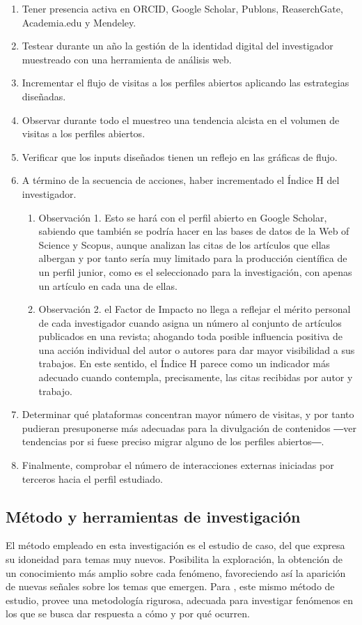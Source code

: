 \documentclass{textolivre}
\begin{document}
\begin{enumerate}
    \item Tener presencia activa en ORCID, Google Scholar, Publons, ReaserchGate, Academia.edu y Mendeley.
    \item Testear durante un año la gestión de la identidad digital del investigador muestreado con una herramienta de análisis web.
    \item Incrementar el flujo de visitas a los perfiles abiertos aplicando las estrategias diseñadas.
    \item Observar durante todo el muestreo una tendencia alcista en el volumen de visitas a los perfiles abiertos.
    \item Verificar que los inputs diseñados tienen un reflejo en las gráficas de flujo.
    \item  A término de la secuencia de acciones, haber incrementado el Índice H del investigador. 
        \begin{enumerate}
        \item Observación 1. Esto se hará con el perfil abierto en Google Scholar, sabiendo que también se podría hacer en las bases de datos de la Web of Science y Scopus, aunque analizan las citas de los artículos que ellas albergan y por tanto sería muy limitado para la producción científica de un perfil junior, como es el seleccionado para la investigación, con apenas un artículo en cada una de ellas.
        \item Observación 2. el Factor de Impacto no llega a reflejar el mérito personal de cada investigador cuando asigna un número al conjunto de artículos publicados en una revista; ahogando toda posible influencia positiva de una acción individual del autor o autores para dar mayor visibilidad a sus trabajos. En este sentido, el Índice H parece como un indicador más adecuado cuando contempla, precisamente, las citas recibidas por autor y trabajo.
        \end{enumerate}
    \item Determinar qué plataformas concentran mayor número de visitas, y por tanto pudieran presuponerse más adecuadas para la divulgación de contenidos ―ver tendencias por si fuese preciso migrar alguno de los perfiles abiertos―.
    \item Finalmente, comprobar el número de interacciones externas iniciadas por terceros hacia el perfil estudiado.
\end{enumerate}

\subsection{Método y herramientas de investigación}\label{sec-metodo}
El método empleado en esta investigación es el estudio de caso, del que  expresa su idoneidad para temas muy nuevos. Posibilita la exploración, la obtención de un conocimiento más amplio sobre cada fenómeno, favoreciendo así la aparición de nuevas señales sobre los temas que emergen. Para \textcite{chetty_case_1996}, este mismo método de estudio, provee una metodología rigurosa, adecuada para investigar fenómenos en los que se busca dar respuesta a cómo y por qué ocurren. 
\end{document}
